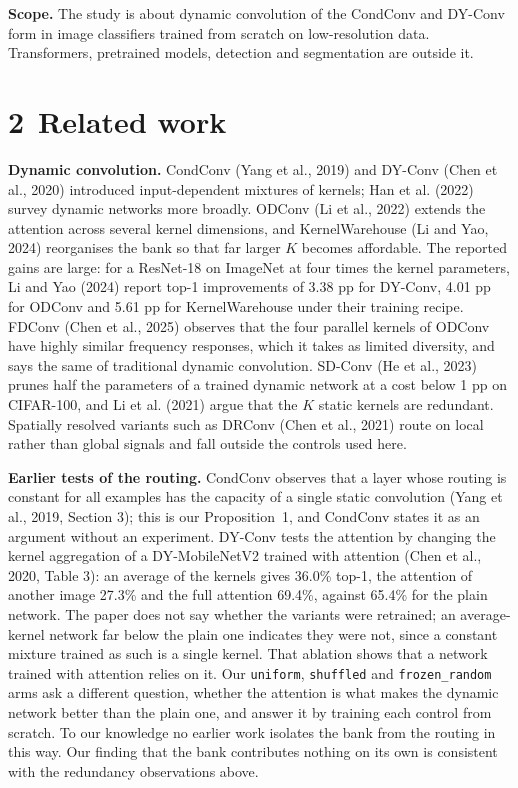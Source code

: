 \documentclass{article}
\begin{document}
\textbf{Scope.}  The study is about dynamic convolution of the CondConv
and DY-Conv form in image classifiers trained from scratch on
low-resolution data. Transformers, pretrained models, detection and
segmentation are outside it.

\section*{2 Related work}

\textbf{Dynamic convolution.}  CondConv (Yang et al., 2019) and
DY-Conv (Chen et al., 2020) introduced input-dependent mixtures of
kernels; Han et al. (2022) survey dynamic networks more broadly.
ODConv (Li et al., 2022) extends the attention across several kernel
dimensions, and KernelWarehouse (Li and Yao, 2024) reorganises
the bank so that far larger $K$ becomes affordable. The reported gains are
large: for a ResNet-18 on ImageNet at four times the kernel parameters,
Li and Yao (2024) report top-1 improvements of 3.38 pp
for DY-Conv, 4.01 pp for ODConv and 5.61 pp for KernelWarehouse
under their training recipe. FDConv (Chen et al., 2025) observes that
the four parallel kernels of ODConv have highly similar frequency
responses, which it takes as limited diversity, and says the same of
traditional dynamic convolution. SD-Conv (He et al., 2023) prunes half
the parameters of a trained dynamic network at a cost below 1 pp on
CIFAR-100, and Li et al. (2021) argue that the $K$ static kernels are
redundant. Spatially resolved variants such as DRConv
(Chen et al., 2021) route on local rather than global signals and fall
outside the controls used here.

\textbf{Earlier tests of the routing.}  CondConv observes that a layer
whose routing is constant for all examples has the capacity of a single
static convolution (Yang et al., 2019, Section 3); this is our
Proposition~1, and CondConv states it as an argument
without an experiment. DY-Conv tests the attention by changing the kernel
aggregation of a DY-MobileNetV2 trained with attention
(Chen et al., 2020, Table 3): an average of the kernels gives
36.0\% top-1, the attention of another image
27.3\% and the full attention 69.4\%, against
65.4\% for the plain network. The paper does not say whether
the variants were retrained; an average-kernel network far below the plain
one indicates they were not, since a constant mixture trained as such is a
single kernel. That ablation shows that a network trained with attention
relies on it. Our \texttt{uniform}, \texttt{shuffled} and
\texttt{frozen\_random} arms ask a different question, whether the
attention is what makes the dynamic network better than the plain one,
and answer it by training each control from scratch. To our knowledge no
earlier work isolates the bank from the routing in this way. Our finding
that the bank contributes nothing on its own is consistent with the
redundancy observations above.
\end{document}
